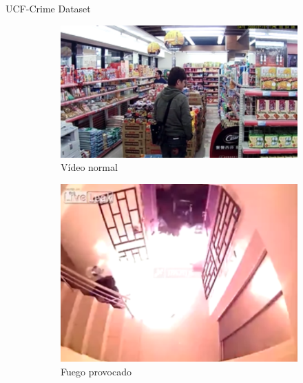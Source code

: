 \documentclass[10pt]{beamer}
\begin{document}
\begin{frame}{UCF-Crime Dataset}
  \begin{figure}[hbtp]
    \centering
    \begin{subfigure}{0.35\textwidth}
      \centering
      \includegraphics[width=\linewidth]{images/ucf/normal-1}
      \caption{Vídeo normal}
    \end{subfigure}
    \begin{subfigure}{0.35\textwidth}
      \centering
      \includegraphics[width=\linewidth]{images/ucf/arson-abnormal}
      \caption{Fuego provocado}
    \end{subfigure}
    \begin{subfigure}{0.35\textwidth}
      \centering

\end{subfigure}
\end{figure}
\end{frame}
\end{document}
